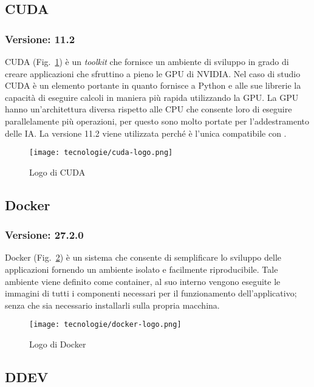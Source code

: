 \subsection{\label{tec:cuda}CUDA}
\subsubsection{Versione: 11.2}
CUDA (Fig.~\ref{fig:logo-cuda}) è un \emph{toolkit} che fornisce un ambiente di sviluppo in grado di creare applicazioni che sfruttino a pieno le GPU di NVIDIA.
Nel caso di studio CUDA è un elemento portante in quanto fornisce a Python e alle sue librerie la capacità di eseguire calcoli in maniera più rapida utilizzando la GPU.
La GPU hanno un'architettura diversa rispetto alle CPU che consente loro di eseguire parallelamente più operazioni, per questo sono molto portate per l'addestramento delle IA.
La versione 11.2 viene utilizzata perché è l'unica compatibile con .

\begin{figure}[!h] 
  \centering 
  \texttt{[image: tecnologie/cuda-logo.png]} 
  \caption{Logo di CUDA}
  \label{fig:logo-cuda}
\end{figure}

\newpage

\subsection{\label{tec:docker}Docker}
\subsubsection{Versione: 27.2.0}
Docker (Fig.~\ref{fig:logo-docker}) è un sistema che consente di semplificare lo sviluppo delle applicazioni fornendo un ambiente isolato e facilmente riproducibile. Tale ambiente viene definito come container, al suo interno vengono eseguite le immagini di tutti i componenti necessari per il funzionamento dell'applicativo; senza che sia necessario installarli sulla propria macchina.

\begin{figure}[!h] 
  \centering 
  \texttt{[image: tecnologie/docker-logo.png]} 
  \caption{Logo di Docker}
  \label{fig:logo-docker}
\end{figure}


\subsection{\label{tec:ddev}DDEV}
